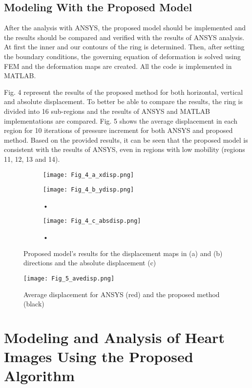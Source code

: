 \documentclass{jicspack}
\begin{document}
\subsection{Modeling With the Proposed Model}
After the analysis with ANSYS, the proposed model should be implemented and the results
should be compared and verified with the results of ANSYS analysis. At first the inner and our contours of the ring is determined. Then, after setting the boundary conditions, the governing equation of deformation is solved using FEM and the deformation maps are created. All the code is implemented in MATLAB. 

Fig. 4 represent the results of the proposed method for both horizontal, vertical and absolute displacement. To better be able to compare the results, the ring is divided into 16 sub-regions and the results of ANSYS and MATLAB implementations are compared. Fig. 5 shows the average displacement in each region for 10 iterations of pressure increment for both ANSYS and proposed method. Based on the provided results, it can be seen that the proposed model is consistent with the results of ANSYS, even in regions with low mobility (regions 11, 12, 13 and 14). 

\begin{figure}
\centering
\begin{subfigure}[b]{.4\textwidth}
\texttt{[image: Fig\_4\_a\_xdisp.png]}
\caption{}
\end{subfigure}
\begin{subfigure}[b]{0.4\textwidth}
\texttt{[image: Fig\_4\_b\_ydisp.png]}
\caption{•}
\end{subfigure}

\begin{subfigure}[b]{0.4\textwidth}
\texttt{[image: Fig\_4\_c\_absdisp.png]}
\caption{•}
\end{subfigure}
\caption{Proposed model's results for the displacement maps in  (a) and  (b) directions and the absolute displacement (c)}
\end{figure}

\begin{figure}
\centering
\texttt{[image: Fig\_5\_avedisp.png]}
\caption{Average displacement for ANSYS (red) and the proposed method (black)}
\end{figure}

\section{Modeling and Analysis of Heart Images Using the Proposed Algorithm }
\end{document}
